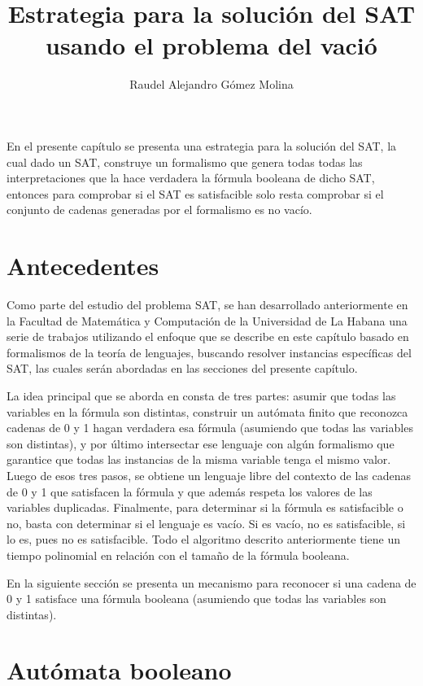 \documentclass[12pt]{article}
\title{Estrategia para la solución del SAT usando el problema del vació}
\author{Raudel Alejandro Gómez Molina}
\begin{document}
\maketitle

En el presente capítulo se presenta una estrategia para la solución del SAT, la cual dado un SAT, 
construye un formalismo que genera todas todas las interpretaciones que la hace verdadera la fórmula 
booleana de dicho SAT, entonces para comprobar si el SAT es satisfacible solo resta comprobar si 
el conjunto de cadenas generadas por el formalismo es no vacío.

\section{Antecedentes}

Como parte del estudio del problema SAT, se han desarrollado anteriormente en 
la Facultad de Matemática y Computación de la Universidad de La Habana 
una serie de trabajos utilizando el enfoque que se describe en este capítulo 
basado en formalismos de la teoría de lenguajes, buscando resolver 
instancias específicas del SAT, las cuales serán abordadas en las secciones del
presente capítulo. 

La idea principal que se aborda en \cite{aCFSAT} consta de tres partes: asumir que todas las variables en 
la fórmula son distintas, construir un autómata finito que reconozca cadenas de 0 y 1 hagan verdadera esa 
fórmula (asumiendo que todas las variables son distintas), y por último intersectar ese lenguaje con algún 
formalismo que garantice que todas las instancias de la misma variable tenga el mismo valor. Luego de esos 
tres pasos, se obtiene un lenguaje libre del contexto de las cadenas de 0 y 1 que satisfacen la fórmula y 
que además respeta los valores de las variables duplicadas.  Finalmente, para determinar si la fórmula es 
satisfacible o no, basta con determinar si el lenguaje es vacío. Si es vacío, no es satisfacible, si lo es, 
pues no es satisfacible. Todo el algoritmo descrito anteriormente tiene un tiempo polinomial en relación con el 
tamaño de la fórmula booleana.

En la siguiente sección se presenta un mecanismo para reconocer si una cadena de 0 y 1 satisface una fórmula booleana
(asumiendo que todas las variables son distintas).

\section{Autómata booleano}
\end{document}
